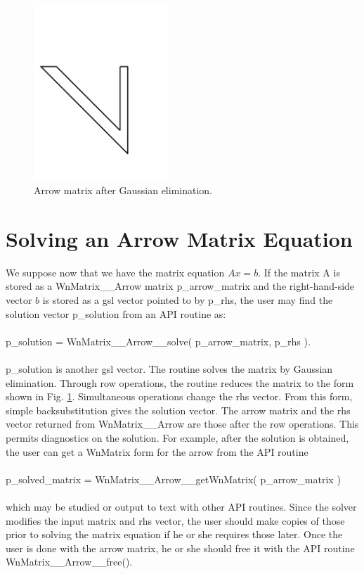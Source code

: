 \documentclass{article}    %
\begin{document}
\begin{figure}[thp]
\centering
\includegraphics[width=2in]{figures/matrix2.pdf}
\caption{Arrow matrix after Gaussian elimination.}
\label{fig:eliminated}
\end{figure}

\section{Solving an Arrow Matrix Equation}

We suppose now that we have the matrix equation $A x = b$.  If the matrix
A is stored as a WnMatrix\_\_Arrow matrix p\_arrow\_matrix and the
right-hand-side vector $b$ is stored as a gsl vector pointed to by p\_rhs,
the user may find the solution vector p\_solution from an API routine
as:\\
\\
p\_solution = WnMatrix\_\_Arrow\_\_solve( p\_arrow\_matrix, p\_rhs ).\\
\\
p\_solution is another gsl vector.  The routine solves the matrix by
Gaussian elimination.  Through row operations, the routine reduces the
matrix to the form shown in Fig. \ref{fig:eliminated}.  Simultaneous
operations change the rhs vector.  From this form,
simple backsubstitution gives the solution vector.  The arrow matrix
and the rhs vector returned from WnMatrix\_\_Arrow are those after
the row operations.  This permits diagnostics on the solution.  
For example, after the solution is obtained, the user can get a
WnMatrix form for the arrow from the API routine\\
\\
p\_solved\_matrix = WnMatrix\_\_Arrow\_\_getWnMatrix( p\_arrow\_matrix )\\
\\
which may be studied or output to text with other API routines.  Since
the solver modifies the input matrix and rhs vector, the user should
make copies of those prior to solving the matrix equation if he or
she requires those later. 
Once the user is done with the arrow matrix, he or she should
free it with the API routine WnMatrix\_\_Arrow\_\_free().
\end{document}
